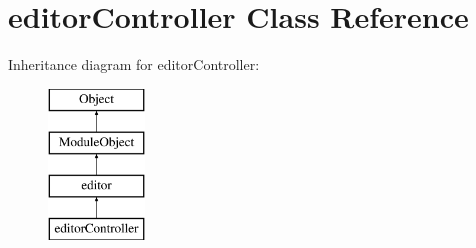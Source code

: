 \hypertarget{classeditorController}{\section{editor\+Controller Class Reference}
\label{classeditorController}
}
Inheritance diagram for editor\+Controller\+:\begin{figure}[H]
\begin{center}
\leavevmode
\includegraphics[height=4.000000cm]{classeditorController}
\end{center}
\end{figure}
